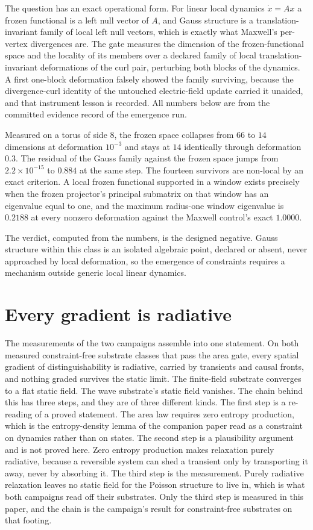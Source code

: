 \documentclass[aps,pre,reprint,nofootinbib]{revtex4-2}
\begin{document}
The question has an exact operational form.  For linear local
dynamics $\dot{x} = Ax$ a frozen functional is a left null vector
of $A$, and Gauss structure is a translation-invariant family of
local left null vectors, which is exactly what Maxwell's per-vertex
divergences are.  The gate measures the dimension of the
frozen-functional space and the locality of its members over a
declared family of local translation-invariant deformations of the
curl pair, perturbing both blocks of the dynamics.  A first
one-block deformation falsely showed the family surviving, because
the divergence-curl identity of the untouched electric-field update
carried it unaided, and that instrument lesson is recorded.  All
numbers below are from the committed evidence record of the
emergence run.

Measured on a torus of side $8$, the frozen space collapses from
$66$ to $14$ dimensions at deformation $10^{-3}$ and stays at $14$
identically through deformation $0.3$.  The residual of the Gauss
family against the frozen space jumps from $2.2\times10^{-15}$ to
$0.884$ at the same step.  The fourteen survivors are non-local by
an exact criterion.  A local frozen functional supported in a
window exists precisely when the frozen projector's principal
submatrix on that window has an eigenvalue equal to one, and the
maximum radius-one window eigenvalue is $0.2188$ at every nonzero
deformation against the Maxwell control's exact $1.0000$.

The verdict, computed from the numbers, is the designed negative.
Gauss structure within this class is an isolated algebraic point,
declared or absent, never approached by local deformation, so the
emergence of constraints requires a mechanism outside generic local
linear dynamics.

\section{Every gradient is radiative}
\label{sec:synthesis}

The measurements of the two campaigns assemble into one statement.
On both measured constraint-free substrate classes that pass the
area gate,
every spatial gradient of distinguishability is radiative, carried
by transients and causal fronts, and nothing graded survives the
static limit.  The finite-field substrate converges to a flat
static field.  The wave substrate's static field vanishes.  The
chain behind this has three steps, and they are of three different
kinds.  The first step is a re-reading of a proved statement.  The
area law requires zero entropy production, which is the
entropy-density lemma of the companion paper read as a constraint on
dynamics rather than on states.  The second step is a plausibility
argument and is not proved here.  Zero entropy production makes
relaxation purely radiative, because a reversible system can shed a
transient only by transporting it away, never by absorbing it.  The
third step is the measurement.  Purely radiative relaxation leaves
no static field for the Poisson structure to live in, which is what
both campaigns read off their substrates.  Only the third step is
measured in this paper, and the chain is the campaign's result for
constraint-free substrates on that footing.
\end{document}
